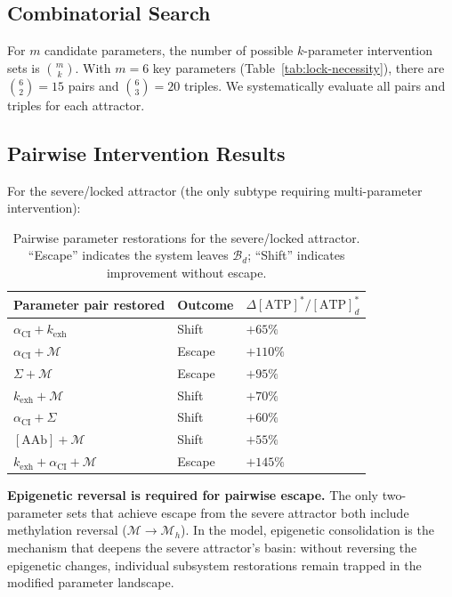 \subsection{Combinatorial Search}

For $m$ candidate parameters, the number of possible $k$-parameter intervention sets is $\binom{m}{k}$. With $m = 6$ key parameters (Table~\ref{tab:lock-necessity}), there are $\binom{6}{2} = 15$ pairs and $\binom{6}{3} = 20$ triples. We systematically evaluate all pairs and triples for each attractor.

\subsection{Pairwise Intervention Results}

For the severe/locked attractor (the only subtype requiring multi-parameter intervention):

\begin{table}[htbp]
\centering
\caption{Pairwise parameter restorations for the severe/locked attractor. ``Escape'' indicates the system leaves $\mathcal{B}_d$; ``Shift'' indicates improvement without escape.}
\label{tab:pairwise-severe}
\begin{tabular}{lll}
\hline
Parameter pair restored & Outcome & $\Delta[\text{ATP}]^*/[\text{ATP}]_d^*$ \\
\hline
$\alpha_{\text{CI}} + k_{\text{exh}}$ & Shift & $+65\%$ \\
$\alpha_{\text{CI}} + \mathcal{M}$ & Escape & $+110\%$ \\
$\Sigma + \mathcal{M}$ & Escape & $+95\%$ \\
$k_{\text{exh}} + \mathcal{M}$ & Shift & $+70\%$ \\
$\alpha_{\text{CI}} + \Sigma$ & Shift & $+60\%$ \\
$[\text{AAb}] + \mathcal{M}$ & Shift & $+55\%$ \\
$k_{\text{exh}} + \alpha_{\text{CI}} + \mathcal{M}$ & Escape & $+145\%$ \\
\hline
\end{tabular}
\end{table}

\textbf{Epigenetic reversal is required for pairwise escape.} The only two-parameter sets that achieve escape from the severe attractor both include methylation reversal ($\mathcal{M} \to \mathcal{M}_h$). In the model, epigenetic consolidation is the mechanism that deepens the severe attractor's basin: without reversing the epigenetic changes, individual subsystem restorations remain trapped in the modified parameter landscape.

